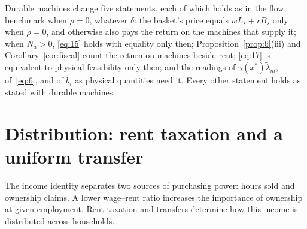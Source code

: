 \documentclass[12pt]{article}
\theoremstyle{plain}
\theoremstyle{definition}
\theoremstyle{remark}
\begin{document}
Durable machines change five statements, each of which holds as in the flow benchmark when $\rho=0$, whatever $\delta$: the basket's price equals $wL_s+rB_s$ only when $\rho=0$, and otherwise also pays the return on the machines that supply it; when $N_a>0$, \eqref{eq:15} holds with equality only then; Proposition~\ref{prop:6}(iii) and Corollary~\ref{cor:fiscal} count the return on machines beside rent; \eqref{eq:17} is equivalent to physical feasibility only then; and the readings of $\gamma(x^*)\widetilde\lambda_m$, of~\eqref{eq:6}, and of $\widetilde b_i$ as physical quantities need it. Every other statement holds as stated with durable machines.

\section{Distribution: rent taxation and a uniform transfer}\label{sec:rent}

The income identity separates two sources of purchasing power: hours sold and ownership claims. A lower wage--rent ratio increases the importance of ownership at given employment. Rent taxation and transfers determine how this income is distributed across households.
\end{document}
